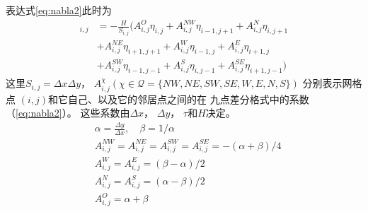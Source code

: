 表达式\ref{eq:nabla2}此时为
\begin{align}
 [\nabla\cdot H \nabla \eta]_{i,j}&= -\frac{H}{S_{i,j}}(A_{i,j}^O\eta_{i,j}+A_{i,j}^{NW}\eta_{i-1,j+1}+A_{i,j}^N\eta_{i,j+1} \nonumber\\
 &+A_{i,j}^{NE}\eta_{i+1,j+1}+A_{i,j}^W\eta_{i-1,j} +A_{i,j}^E\eta_{i+1,j} \nonumber\\
& +A_{i,j}^{SW}\eta_{i-1,j-1} +A_{i,j}^S\eta_{i,j-1}+ A_{i,j}^{SE}\eta_{i+1,j-1})
\end{align}
这里$S_{i,j}  = \Delta x\Delta y$， $A_{i,j}^{\chi } ( \chi \in \mathcal{Q} = \{NW,NE, SW, SE, W, E, N, S\})$ 分别表示网格点 $(i,j)$和它自己、以及它的邻居点之间的在 九点差分格式中的系数（\ref{eq:nabla2}）。 这些系数由$\Delta x$， $\Delta y$， $\tau$和$H$决定。
\begin{equation} \label{defineA}
\begin{aligned}
&\alpha  = \frac{ \Delta y}{ \Delta x }, \quad \beta  = 1/\alpha \\
&A_{i,j}^{NW} = A_{i,j}^{NE} =A_{i,j}^{SW} = A_{i,j}^{SE} = - (\alpha  +  \beta  )/4 \\
&A_{i,j}^{W} = A_{i,j}^{E} = (  \beta  -\alpha  )/2 \\
&A_{i,j}^{N} = A_{i,j}^{S} = (\alpha  -\beta )/2 \\
&A_{i,j}^{O} =   \alpha   +\beta  \\
\end{aligned}
\end{equation}


